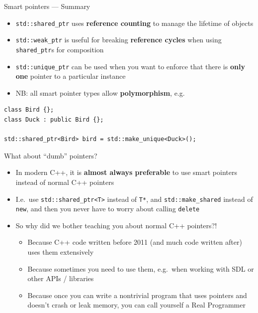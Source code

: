 \begin{frame}[fragile]{Smart pointers --- Summary}
    \begin{itemize}
        \item \lstinline{std::shared_ptr} uses \textbf{reference counting} to manage the lifetime
            of objects \pause
        \item \lstinline{std::weak_ptr} is useful for breaking \textbf{reference cycles}
            when using \lstinline{shared_ptr}s for composition \pause
        \item \lstinline{std::unique_ptr} can be used when you want to enforce that there is
            \textbf{only one} pointer to a particular instance \pause
        \item NB: all smart pointer types allow \textbf{polymorphism}, e.g.
    \end{itemize}
    \begin{lstlisting}
class Bird {};
class Duck : public Bird {};

std::shared_ptr<Bird> bird = std::make_unique<Duck>();
    \end{lstlisting}
\end{frame}

\begin{frame}[fragile]{What about ``dumb'' pointers?}
    \begin{itemize}
        \item In modern C++, it is \textbf{almost always preferable} to use smart pointers
            instead of normal C++ pointers \pause
        \item I.e.\ use \lstinline{std::shared_ptr<T>} instead of \lstinline{T*},
            and \lstinline{std::make_shared} instead of \lstinline{new},
            and then you never have to worry about calling \lstinline{delete} \pause
        \item So why did we bother teaching you about normal C++ pointers?! \pause
            \begin{itemize}
                \item Because C++ code written before 2011 (and much code written after)
                    uses them extensively \pause
                \item Because sometimes you need to use them,
                    e.g.\ when working with SDL or other APIs / libraries \pause
                \item Because once you can write a nontrivial program that uses pointers and doesn't
                    crash or leak memory, you can call yourself a Real Programmer \smiley
            \end{itemize}
    \end{itemize}
\end{frame}

